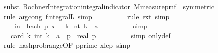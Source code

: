 \begin{isabellebody}
\ {\isacharparenleft}{\kern0pt}subst\ Bochner{\isacharunderscore}{\kern0pt}Integration{\isachardot}{\kern0pt}integral{\isacharunderscore}{\kern0pt}indicator{\isacharbrackleft}{\kern0pt}\ M{\isacharequal}{\kern0pt}{\isachardoublequoteopen}measure{\isacharunderscore}{\kern0pt}pmf\ {\isasymOmega}\ symmetric{\isacharbrackright}{\kern0pt}{\isacharparenright}{\kern0pt}\isanewline
\ \ \ \ \ \ \ \ \isamarkupfalse%
\ {\isacharparenleft}{\kern0pt}rule\ arg{\isacharunderscore}{\kern0pt}cong{}{\isacharbrackleft}{\kern0pt}\ f{\isacharequal}{\kern0pt}{\isachardoublequoteopen}integral\isactrlsup L{\isachardoublequoteclose}{\isacharbrackright}{\kern0pt}{\isacharcomma}{\kern0pt}\ simp{\isacharparenright}{\kern0pt}\isanewline
\ \ \ \ \ \ \ \ \isamarkupfalse%
\ {\isacharparenleft}{\kern0pt}rule\ ext{\isacharcomma}{\kern0pt}\ simp{\isacharparenright}{\kern0pt}\isanewline
\ \ \ \ \ \ \isamarkupfalse%
\ \isamarkupfalse%
\ {\isachardoublequoteopen}{\isachardot}{\kern0pt}{\isachardot}{\kern0pt}{\isachardot}{\kern0pt}\ {\isacharequal}{\kern0pt}\ {\isasymP}{\isacharparenleft}{\kern0pt}{\isasymomega}\ in\ {\isasymOmega}\ hash\ p\ x\ {\isasymomega}\ {\isasymin}\ {\isacharbraceleft}{\kern0pt}k{\isachardot}{\kern0pt}\ int\ k\ {\isasymle}\ a{\isacharbraceright}{\kern0pt}{\isacharparenright}{\kern0pt}{\isachardoublequoteclose}\isanewline
\ \ \ \ \ \ \ \ \isamarkupfalse%
\ simp\isanewline
\ \ \ \ \ \ \isamarkupfalse%
\ \isamarkupfalse%
\ {\isachardoublequoteopen}{\isachardot}{\kern0pt}{\isachardot}{\kern0pt}{\isachardot}{\kern0pt}\ {\isacharequal}{\kern0pt}\ card\ {\isacharparenleft}{\kern0pt}{\isacharbraceleft}{\kern0pt}k{\isachardot}{\kern0pt}\ int\ k\ {\isasymle}\ a{\isacharbraceright}{\kern0pt}\ {\isasyminter}\ {\isacharbraceleft}{\kern0pt}{}{\isachardot}{\kern0pt}{\isachardot}{\kern0pt}{\isacharless}{\kern0pt}p{\isacharbraceright}{\kern0pt}{\isacharparenright}{\kern0pt}\ {\isacharslash}{\kern0pt}\ real\ p{\isachardoublequoteclose}\isanewline
\ \ \ \ \ \ \ \ \isamarkupfalse%
\ {\isacharparenleft}{\kern0pt}simp\ only{\isacharcolon}{\kern0pt}{\isasymOmega}def{\isacharparenright}{\kern0pt}\isanewline
\ \ \ \ \ \ \ \ \isamarkupfalse%
\ {\isacharparenleft}{\kern0pt}rule\ hash{\isacharunderscore}{\kern0pt}prob{\isacharunderscore}{\kern0pt}range{\isacharbrackleft}{\kern0pt}OF\ p{\isacharunderscore}{\kern0pt}prime\ x{\isacharunderscore}{\kern0pt}le{\isacharunderscore}{\kern0pt}p{\isacharbrackright}{\kern0pt}{\isacharcomma}{\kern0pt}\ simp{\isacharparenright}{\kern0pt}\isanewline

\end{isabellebody}
